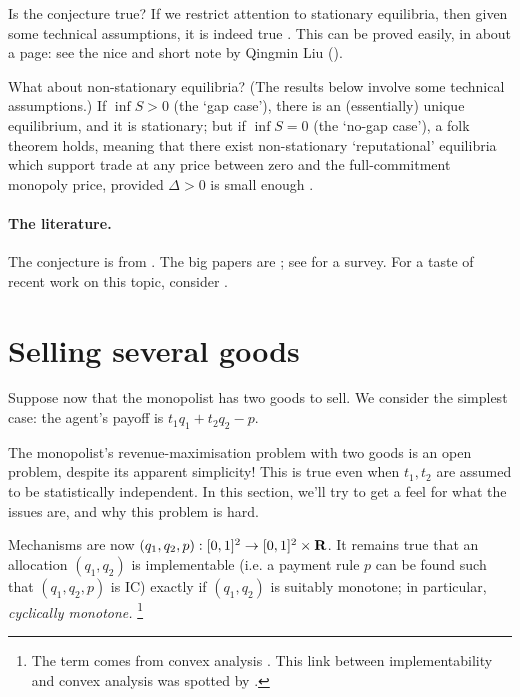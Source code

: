 Is the conjecture true?
If we restrict attention to stationary equilibria,
then given some technical assumptions,
it is indeed true \parencite{GulSonnenscheinWilson1986}.
This can be proved easily, in about a page: see the nice and short note by Qingmin Liu (\citeyear{Liu2015}).

What about non-stationary equilibria?
(The results below involve some technical assumptions.)
If $\inf S > 0$ (the `gap case'), there is an (essentially) unique equilibrium, and it is stationary;
but if $\inf S = 0$ (the `no-gap case'), a folk theorem holds, 
meaning that there exist non-stationary `reputational' equilibria
which support trade at any price between zero and the full-commitment monopoly price, provided $\Delta>0$ is small enough \parencite{GulSonnenscheinWilson1986,AusubelDeneckere1989}.


\paragraph{The literature.}
The conjecture is from \textcite{Coase1972}.
The big papers are \textcite{FudenbergLevineTirole1985,GulSonnenscheinWilson1986,AusubelDeneckere1989};
see \textcite{AusubelCramtonDeneckere2002} for a survey.
For a taste of recent work on this topic, consider \textcite{DovalSkreta2021}.



\section{Selling several goods}
\label{sec:ch1:multi-d}

Suppose now that the monopolist has two goods to sell.
We consider the simplest case: the agent's payoff is $t_1 q_1 + t_2 q_2 - p$.

The monopolist's revenue-maximisation problem with two goods is an open problem, despite its apparent simplicity!
This is true even when $t_1,t_2$ are assumed to be statistically independent.
In this section, we'll try to get a feel for what the issues are, and why this problem is hard.

Mechanisms are now $(q_1,q_2,p) : [0,1]^2 \to [0,1]^2 \times \mathbf{R}$.
It remains true that an allocation $(q_1,q_2)$ is implementable (i.e. a payment rule $p$ can be found such that $(q_1,q_2,p)$ is IC)
exactly if $(q_1,q_2)$ is suitably monotone;
in particular, \emph{cyclically monotone.}%
	\footnote{The term comes from convex analysis \parencite[see][]{Rockafellar1970}. This link between implementability and convex analysis was spotted by \textcite{Rochet1987}.}


